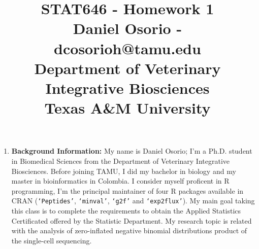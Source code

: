 \documentclass[12pt,a4paper]{paper}
\begin{document}
\title{STAT646 - Homework 1\\\small{Daniel Osorio - dcosorioh@tamu.edu\\Department of Veterinary Integrative Biosciences\\Texas A\&M University}}
\maketitle

\begin{enumerate}
\item \textbf{Background Information:} My name is Daniel Osorio; I'm a Ph.D. student in Biomedical Sciences from the Department of Veterinary Integrative Biosciences. Before joining TAMU, I did my bachelor in biology and my master in bioinformatics in Colombia. I consider myself proficent in R programming, I'm the principal maintainer of four R packages available in CRAN (\texttt{`Peptides'}, \texttt{`minval'}, \texttt{`g2f'} and \texttt{`exp2flux'}). My main goal taking this class is to complete the requirements to obtain the Applied Statistics Certificated offered by the Statistic Department. My research topic is related with the analysis of zero-inflated negative binomial distributions product of the single-cell sequencing.
\end{enumerate}
\end{document}
